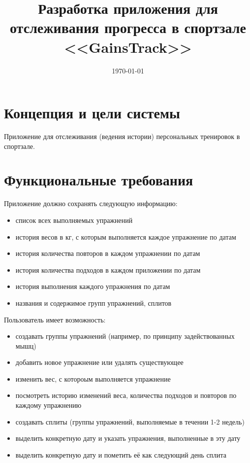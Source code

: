 

\title{Разработка приложения для отслеживания прогресса в спортзале <<GainsTrack>>}
\date{\today}


	\maketitle
	\thispagestyle{empty}
	\newpage
	
	\setcounter{page}{2}
	
	\section{Концепция и цели системы}
	Приложение для отслеживания (ведения истории) персональных тренировок в спортзале.
	
	\section{Функциональные требования}
	Приложение должно сохранять следующую информацию:
	\begin{itemize}
		\item список всех выполняемых упражнений
		\item история весов в кг, с которым выполняется каждое упражнение по датам
		\item история количества повторов в каждом упражнении по датам
		\item история количества подходов в каждом приложении по датам
		\item история выполнения каждого упражнения по датам
		\item названия и содержимое групп упражнений, сплитов
	\end{itemize}
	
	Пользователь имеет возможность:
	\begin{itemize}
		\item создавать группы упражнений (например, по принципу задействованных мышц)
		\item добавить новое упражнение или удалять существующее
		\item изменить вес, с котороым выполняется упражнение
		\item посмотреть историю изменений веса, количества подходов и повторов по каждому упражнению
		\item создавать сплиты (группы упражнений, выполняемые в течении 1-2 недель)
		\item выделить конкретную дату и указать упражнения, выполненные в эту дату
		\item выделить конкретную дату и пометить её как следующий день сплита
	\end{itemize}
	
